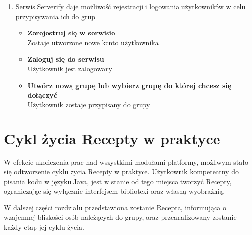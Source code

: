 \documentclass[11pt,a4paper,polish,thesis]{dcsbook}
\begin{document}
\begin{enumerate}
\begin{itemize}
\end{itemize}
\item
Serwis Serverify daje możliwość rejestracji i logowania użytkowników w celu przypisywania ich do grup
\begin{itemize}
\item \textbf{Zarejestruj się w serwisie}\\
Zostaje utworzone nowe konto użytkownika
\item \textbf{Zaloguj się do serwisu}\\
Użytkownik jest zalogowany
\item \textbf{Utwórz nową grupę lub wybierz grupę do której chcesz się dołączyć}\\
Użytkownik zostaje przypisany do grupy
\end{itemize}
\end{enumerate}

\section{Cykl życia Recepty w praktyce}
W efekcie ukończenia prac nad wszystkimi modułami platformy, możliwym stało się odtworzenie cyklu życia Recepty w praktyce. Użytkownik kompetentny do pisania
kodu w języku Java, jest w stanie od tego miejsca tworzyć Recepty, ograniczając się wyłącznie interfejsem biblioteki oraz własną wyobraźnią.

W dalszej części rozdziału przedstawiona zostanie Recepta, informująca o wzajemnej bliskości osób należących do grupy, oraz przeanalizowany zostanie każdy etap
jej cyklu życia.
\end{document}
